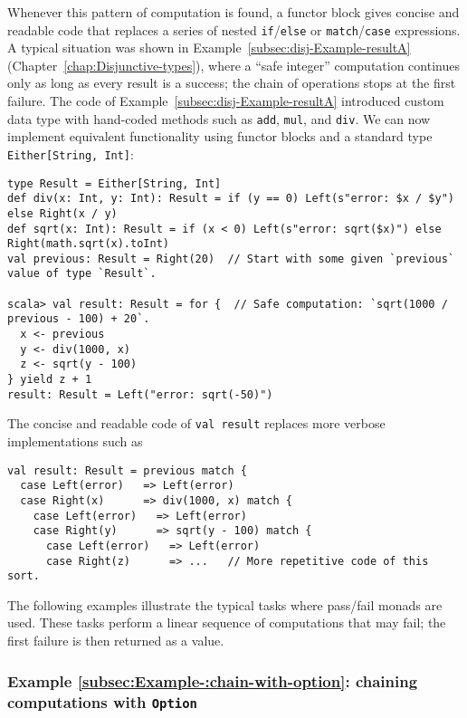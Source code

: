 Whenever this pattern of computation is found, a functor block gives
concise and readable code that replaces a series of nested \lstinline!if!/\lstinline!else!
or \lstinline!match!/\lstinline!case! expressions. A typical situation
was shown in Example~\ref{subsec:disj-Example-resultA} (Chapter~\ref{chap:Disjunctive-types}),
where a \textsf{``}safe integer\textsf{''} computation continues only as long as every
result is a success; the chain of operations stops at the first failure.
The code of Example~\ref{subsec:disj-Example-resultA} introduced
custom data type with hand-coded methods such as \lstinline!add!,
\lstinline!mul!, and \lstinline!div!. We can now implement equivalent
functionality using functor blocks and a standard type \lstinline!Either[String, Int]!:
\begin{lstlisting}
type Result = Either[String, Int]
def div(x: Int, y: Int): Result = if (y == 0) Left(s"error: $x / $y") else Right(x / y)
def sqrt(x: Int): Result = if (x < 0) Left(s"error: sqrt($x)") else Right(math.sqrt(x).toInt)
val previous: Result = Right(20)  // Start with some given `previous` value of type `Result`.

scala> val result: Result = for {  // Safe computation: `sqrt(1000 / previous - 100) + 20`.
  x <- previous
  y <- div(1000, x)
  z <- sqrt(y - 100)
} yield z + 1
result: Result = Left("error: sqrt(-50)")
\end{lstlisting}
The concise and readable code of \lstinline!val result! replaces
more verbose implementations such as
\begin{lstlisting}
val result: Result = previous match {
  case Left(error)   => Left(error)
  case Right(x)      => div(1000, x) match {
    case Left(error)   => Left(error)
    case Right(y)      => sqrt(y - 100) match {
      case Left(error)   => Left(error)
      case Right(z)      => ...   // More repetitive code of this sort.
\end{lstlisting}

The following examples illustrate the typical tasks where pass/fail
monads are used. These tasks perform a linear sequence of computations
that may fail; the first failure is then returned as a value.

\subsubsection{Example \label{subsec:Example-:chain-with-option}\ref{subsec:Example-:chain-with-option}:
chaining computations with \texttt{Option}}

